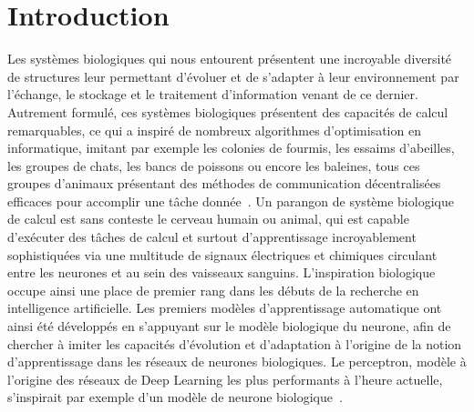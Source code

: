 \chapter*{Introduction}

Les systèmes biologiques qui nous entourent présentent une incroyable diversité de structures leur permettant d'évoluer et de s'adapter à leur environnement par l'échange, le stockage et le traitement d'information venant de ce dernier.
Autrement formulé, ces systèmes biologiques présentent des capacités de calcul remarquables, ce qui a inspiré de nombreux algorithmes d'optimisation en informatique, imitant par exemple les colonies de fourmis, les essaims d'abeilles, les groupes de chats, les bancs de poissons ou encore les baleines, tous ces groupes d'animaux présentant des méthodes de communication décentralisées efficaces pour accomplir une tâche donnée~\parencite{Darwish2018BioinspiredCA,nature_inspired_2020}.
Un parangon de système biologique de calcul est sans conteste le cerveau humain ou animal, qui est capable d'exécuter des tâches de calcul et surtout d'apprentissage incroyablement sophistiquées via une multitude de signaux électriques et chimiques circulant entre les neurones et au sein des vaisseaux sanguins.
L'inspiration biologique occupe ainsi une place de premier rang dans les débuts de la recherche en intelligence artificielle.
Les premiers modèles d'apprentissage automatique ont ainsi été développés en s'appuyant sur le modèle biologique du neurone, afin de chercher à imiter les capacités d'évolution et d'adaptation à l'origine de la notion d'apprentissage dans les réseaux de neurones biologiques. Le perceptron, modèle à l'origine des réseaux de Deep Learning les plus performants à l'heure actuelle, s'inspirait par exemple d'un modèle de neurone biologique~\parencite{McCulloch1990ALC}.
